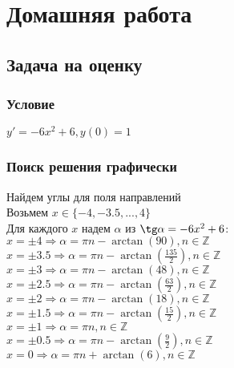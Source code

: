 \section{Домашняя работа}

\subsection{Задача на оценку}
\subsubsection{Условие}
$y' = -6x^2 + 6, y(0) = 1$

\subsubsection{Поиск решения графически}
Найдем углы для поля направлений \\
Возьмем $x \in \{-4, -3.5, ..., 4\}$ \\
Для каждого $x$ надем $\alpha$ из $\tg \alpha = -6x^2 + 6$: \\
$x = \pm 4 \Rightarrow \alpha = \pi n - \arctan(90), n \in \mathbb{Z}$ \\
$x = \pm3.5 \Rightarrow \alpha = \pi n - \arctan\left(\frac{135}{2}\right), n \in \mathbb{Z}$ \\
$x = \pm 3 \Rightarrow \alpha = \pi n - \arctan(48), n \in \mathbb{Z}$ \\
$x = \pm 2.5 \Rightarrow \alpha = \pi n - \arctan\left(\frac{63}{2}\right), n \in \mathbb{Z}$ \\
$x = \pm 2 \Rightarrow \alpha = \pi n - \arctan(18), n \in \mathbb{Z}$ \\
$x = \pm 1.5 \Rightarrow \alpha = \pi n - \arctan\left(\frac{15}{2}\right), n \in \mathbb{Z}$ \\
$x = \pm 1 \Rightarrow \alpha = \pi n , n \in \mathbb{Z}$ \\
$x = \pm 0.5 \Rightarrow \alpha = \pi n - \arctan\left(\frac{9}{2}\right), n \in \mathbb{Z}$ \\
$x = 0 \Rightarrow \alpha = \pi n + \arctan(6), n \in \mathbb{Z}$ \\

